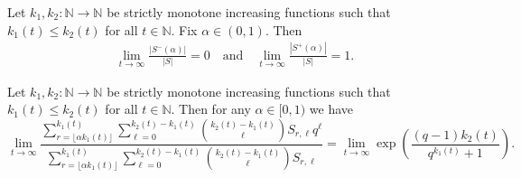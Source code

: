 \documentclass[10pt,a4paper]{amsart}
\begin{document}
\begin{Lemma}\label{lem:density}
Let $k_1,k_2\colon \mathbb{N}\rightarrow \mathbb{N}$ be strictly monotone increasing functions such that $k_1(t)\leq k_2(t)$ for all $t\in \mathbb{N}$.
Fix $\alpha\in(0,1)$. 
Then 
\begin{align*}
    \lim_{t\rightarrow \infty}\frac{|S^-(\alpha)|}{|S|} = 0 \quad \text{and} \quad \lim_{t\rightarrow \infty}\frac{|S^+(\alpha)|}{|S|} = 1.
\end{align*}
\end{Lemma}

\begin{Lemma}
Let $k_1,k_2\colon \mathbb{N}\rightarrow \mathbb{N}$ be strictly monotone increasing functions such that $k_1(t)\leq k_2(t)$ for all $t\in \mathbb{N}$.
Then for any $\alpha \in [0,1)$ we have
    $$\lim_{t \rightarrow \infty} \frac{\sum_{r=\lfloor\alpha k_1(t)\rfloor}^{k_1(t)} \sum_{\ell=0}^{k_2(t)-k_1(t)} \binom{k_2(t)-k_1(t)}{\ell}S_{r,\ell}q^{\ell}}{\sum_{r=\lfloor \alpha k_1(t) \rfloor}^{k_1(t)} \sum_{\ell=0}^{k_2(t)-k_1(t)} \binom{k_2(t)-k_1(t)}{\ell}S_{r,\ell}} = \lim_{t\rightarrow \infty} \exp \left( \frac{(q-1)k_2(t)}{q^{k_1(t)}+1}\right).
$$ \label{lem:weighteddensity}
\end{Lemma}
\end{document}
